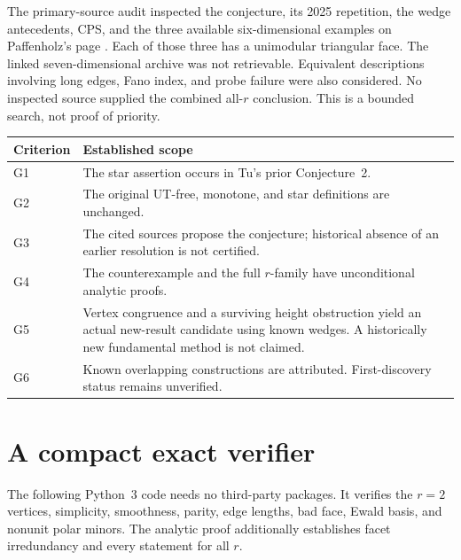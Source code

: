 \documentclass[11pt]{article}
\theoremstyle{remark}\newtheorem{remark}[theorem]{Remark}
\begin{document}
The primary-source audit inspected the conjecture, its 2025 repetition,
the wedge antecedents, CPS, and the three available six-dimensional
examples on Paffenholz's page \cite{PaffenholzData}.
Each of those three has a unimodular triangular face.
The linked seven-dimensional archive was not retrievable.
Equivalent descriptions involving long edges, Fano index, and probe
failure were also considered. No inspected source supplied the combined
all-\(r\) conclusion. This is a bounded search, not proof of priority.

\begin{center}\small
\begin{tabular}{@{}p{.09\linewidth}p{.84\linewidth}@{}}
\toprule
Criterion&Established scope\\
\midrule
G1&The star assertion occurs in Tu's prior Conjecture~2.\\
G2&The original UT-free, monotone, and star definitions are unchanged.\\
G3&The cited sources propose the conjecture; historical absence of an
earlier resolution is not certified.\\
G4&The counterexample and the full \(r\)-family have unconditional
analytic proofs.\\
G5&Vertex congruence and a surviving height obstruction yield an actual
new-result candidate using known wedges. A historically new fundamental
method is not claimed.\\
G6&Known overlapping constructions are attributed. First-discovery
status remains unverified.\\
\bottomrule
\end{tabular}
\end{center}

\appendix
\section{A compact exact verifier}\label{app:code}
The following Python~3 code needs no third-party packages.
It verifies the \(r=2\) vertices, simplicity, smoothness, parity,
edge lengths, bad face, Ewald basis, and nonunit polar minors.
The analytic proof additionally establishes facet irredundancy
and every statement for all \(r\).
\end{document}
